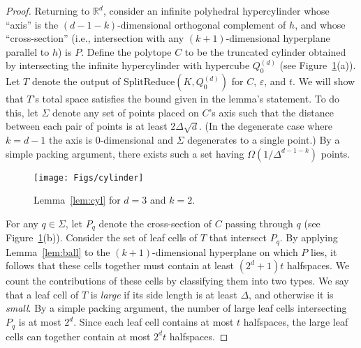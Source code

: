 \documentclass[11pt]{article}   \usepackage[letterpaper,hmargin=2.1cm,vmargin=3cm]{geometry}
\newcommand{\RE}{\mathbb{R}}    \newcommand{\ZZ}{\mathbb{Z}}    \newcommand{\eps}{\varepsilon}  \newcommand{\ST}{\,:\,}         \newcommand{\sq}{\square}
\newcommand{\alg}{\textrm{SplitReduce}}
\begin{document}
\begin{proof}
Returning to $\RE^d$, consider an infinite polyhedral hypercylinder whose ``axis'' is the $(d-1-k)$-dimensional orthogonal complement of $h$, and whose ``cross-section'' (i.e., intersection with any $(k+1)$-dimensional hyperplane parallel to $h$) is $P$. Define the polytope $C$ to be the truncated cylinder obtained by intersecting the infinite hypercylinder with hypercube $Q_0^{(d)}$ (see Figure~\ref{fig:cylinder}(a)). Let $T$ denote the output of $\alg(K,Q_0^{(d)})$ for $C$, $\eps$, and $t$. We will show that $T$'s total space satisfies the bound given in the lemma's statement. To do this, let $\Sigma$ denote any set of points placed on $C$'s axis such that the distance between each pair of points is at least $2\Delta\sqrt{d}$. (In the degenerate case where $k = d-1$ the axis is $0$-dimensional and $\Sigma$ degenerates to a single point.) By a simple packing argument, there exists such a set having $\Omega(1/\Delta^{d-1-k})$ points.

\begin{figure}[htbp]
  \centerline{\texttt{[image: Figs/cylinder]}}
  \caption{Lemma~\ref{lem:cyl} for $d = 3$ and $k = 2$.}
  \label{fig:cylinder}
\end{figure}


For any $q \in \Sigma$, let $P_q$ denote the cross-section of $C$ passing through $q$ (see Figure~\ref{fig:cylinder}(b)). Consider the set of leaf cells of $T$ that intersect $P_q$. By applying Lemma~\ref{lem:ball} to the $(k+1)$-dimensional hyperplane on which $P$ lies, it follows that these cells together must contain at least $(2^d + 1) t$ halfspaces. We count the contributions of these cells by classifying them into two types. We say that a leaf cell of $T$ is \emph{large} if its side length is at least $\Delta$, and otherwise it is \emph{small}. By a simple packing argument, the number of large leaf cells intersecting $P_q$ is at most $2^d$. Since each leaf cell contains at most $t$ halfspaces, the large leaf cells can together contain at most $2^d t$ halfspaces. 


\end{proof}
\end{document}
